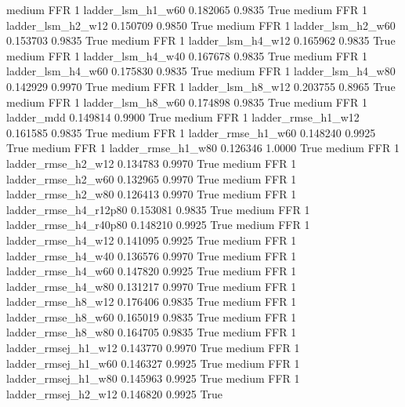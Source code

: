     medium      FFR                 1      ladder_lsm_h1_w60   0.182065      0.9835    True
    medium      FFR                 1      ladder_lsm_h2_w12   0.150709      0.9850    True
    medium      FFR                 1      ladder_lsm_h2_w60   0.153703      0.9835    True
    medium      FFR                 1      ladder_lsm_h4_w12   0.165962      0.9835    True
    medium      FFR                 1      ladder_lsm_h4_w40   0.167678      0.9835    True
    medium      FFR                 1      ladder_lsm_h4_w60   0.175830      0.9835    True
    medium      FFR                 1      ladder_lsm_h4_w80   0.142929      0.9970    True
    medium      FFR                 1      ladder_lsm_h8_w12   0.203755      0.8965    True
    medium      FFR                 1      ladder_lsm_h8_w60   0.174898      0.9835    True
    medium      FFR                 1             ladder_mdd   0.149814      0.9900    True
    medium      FFR                 1     ladder_rmse_h1_w12   0.161585      0.9835    True
    medium      FFR                 1     ladder_rmse_h1_w60   0.148240      0.9925    True
    medium      FFR                 1     ladder_rmse_h1_w80   0.126346      1.0000    True
    medium      FFR                 1     ladder_rmse_h2_w12   0.134783      0.9970    True
    medium      FFR                 1     ladder_rmse_h2_w60   0.132965      0.9970    True
    medium      FFR                 1     ladder_rmse_h2_w80   0.126413      0.9970    True
    medium      FFR                 1  ladder_rmse_h4_r12p80   0.153081      0.9835    True
    medium      FFR                 1  ladder_rmse_h4_r40p80   0.148210      0.9925    True
    medium      FFR                 1     ladder_rmse_h4_w12   0.141095      0.9925    True
    medium      FFR                 1     ladder_rmse_h4_w40   0.136576      0.9970    True
    medium      FFR                 1     ladder_rmse_h4_w60   0.147820      0.9925    True
    medium      FFR                 1     ladder_rmse_h4_w80   0.131217      0.9970    True
    medium      FFR                 1     ladder_rmse_h8_w12   0.176406      0.9835    True
    medium      FFR                 1     ladder_rmse_h8_w60   0.165019      0.9835    True
    medium      FFR                 1     ladder_rmse_h8_w80   0.164705      0.9835    True
    medium      FFR                 1    ladder_rmsej_h1_w12   0.143770      0.9970    True
    medium      FFR                 1    ladder_rmsej_h1_w60   0.146327      0.9925    True
    medium      FFR                 1    ladder_rmsej_h1_w80   0.145963      0.9925    True
    medium      FFR                 1    ladder_rmsej_h2_w12   0.146820      0.9925    True
